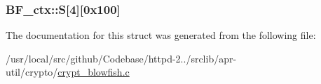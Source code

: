 \subsubsection[{\texorpdfstring{S}{S}}]{ B\+F\+\_\+ctx\+::S\mbox{[}4\mbox{]}\mbox{[}0x100\mbox{]}}\hypertarget{structBF__ctx_ae16879b199664e199cacb4fe5d43d94b}{}\label{structBF__ctx_ae16879b199664e199cacb4fe5d43d94b}


The documentation for this struct was generated from the following file\+:\begin{DoxyCompactItemize}
\item 
/usr/local/src/github/\+Codebase/httpd-\/2../srclib/apr-\/util/crypto/\hyperlink{crypt__blowfish_8c}{crypt\+\_\+blowfish.\+c}\end{DoxyCompactItemize}
